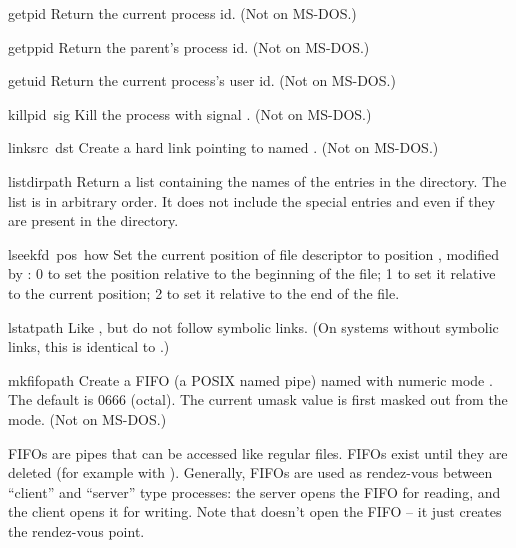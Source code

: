\begin{funcdesc}{getpid}{}
Return the current process id.
(Not on MS-DOS.)
\end{funcdesc}

\begin{funcdesc}{getppid}{}
Return the parent's process id.
(Not on MS-DOS.)
\end{funcdesc}

\begin{funcdesc}{getuid}{}
Return the current process's user id.
(Not on MS-DOS.)
\end{funcdesc}

\begin{funcdesc}{kill}{pid\, sig}
Kill the process  with signal .
(Not on MS-DOS.)
\end{funcdesc}

\begin{funcdesc}{link}{src\, dst}
Create a hard link pointing to  named .
(Not on MS-DOS.)
\end{funcdesc}

\begin{funcdesc}{listdir}{path}
Return a list containing the names of the entries in the directory.
The list is in arbitrary order.  It does not include the special
entries  and  even if they are present in the
directory.
\end{funcdesc}

\begin{funcdesc}{lseek}{fd\, pos\, how}
Set the current position of file descriptor  to position
, modified by : 0 to set the position relative to
the beginning of the file; 1 to set it relative to the current
position; 2 to set it relative to the end of the file.
\end{funcdesc}

\begin{funcdesc}{lstat}{path}
Like , but do not follow symbolic links.  (On systems
without symbolic links, this is identical to .)
\end{funcdesc}

\begin{funcdesc}{mkfifo}{path}
Create a FIFO (a POSIX named pipe) named  with numeric mode
.  The default  is 0666 (octal).  The current
umask value is first masked out from the mode.
(Not on MS-DOS.)

FIFOs are pipes that can be accessed like regular files.  FIFOs exist
until they are deleted (for example with ).
Generally, FIFOs are used as rendez-vous between ``client'' and
``server'' type processes: the server opens the FIFO for reading, and
the client opens it for writing.  Note that  doesn't
open the FIFO -- it just creates the rendez-vous point.
\end{funcdesc}


